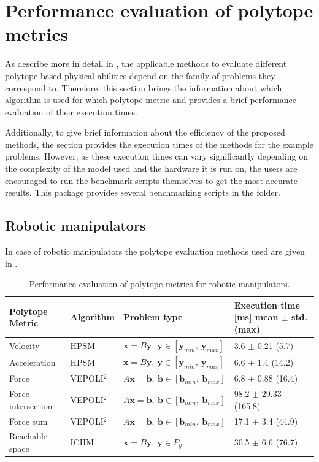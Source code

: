 \section{Performance evaluation of polytope metrics}
\label{sec:pycapacity_performance}
As describe more in detail in , the applicable methods to evaluate different polytope based physical abilities depend on the family of problems they correspond to. Therefore, this section brings the information about which algorithm is used for which polytope metric and provides a brief performance evaluation of their execution times.

Additionally, to give brief information about the efficiency of the proposed methods, the section provides the execution times of the methods for the example problems. However, as these execution times can vary significantly depending on the complexity of the model used and the hardware it is run on, the users are encouraged to run the benchmark scripts themselves to get the most accurate results. This package provides several benchmarking scripts in the  folder.

\subsection{Robotic manipulators}

In case of robotic manipulators the polytope evaluation methods used are given in .
\begin{table}[h]
\centering
\begin{tabular}{|l|l|l|l|}
\hline
Polytope Metric & Algorithm & Problem type & \makecell[c]{Execution time [ms] \\ mean $\pm$ std. (max)}  \\
\hline
Velocity & HPSM & $\bm{x}=B\bm{y},~ \bm{y} \in [\bm{y}_{min}, ~\bm{y}_{max}]$ & 3.6 $\pm$ 0.21 (5.7) \\
Acceleration & HPSM & $\bm{x}=B\bm{y},~ \bm{y} \in [\bm{y}_{min}, ~\bm{y}_{max}]$ & 6.6 $\pm$ 1.4 (14.2) \\
Force & VEPOLI$^2$ & $A\bm{x}=\bm{b}, ~\bm{b} \in [\bm{b}_{min}, ~\bm{b}_{max}]$ & 6.8 $\pm$ 0.88 (16.4) \\
Force intersection & VEPOLI$^2$ & $A\bm{x}=\bm{b},~\bm{b} \in [\bm{b}_{min}, ~\bm{b}_{max}]$ & 98.2 $\pm$ 29.33 (165.8) \\
Force sum & VEPOLI$^2$ & $A\bm{x}=\bm{b},~\bm{b} \in [\bm{b}_{min}, ~\bm{b}_{max}]$ & 17.1 $\pm$ 3.4 (44.9) \\
Reachable space & ICHM & $\bm{x}=B\bm{y},~ \bm{y} \in P_{y}$ & 30.5 $\pm$ 6.6 (76.7) \\
\hline
\end{tabular}
\caption{Performance evaluation of polytope metrics for robotic manipulators.}
\label{tab:methods_robots}
\end{table}

